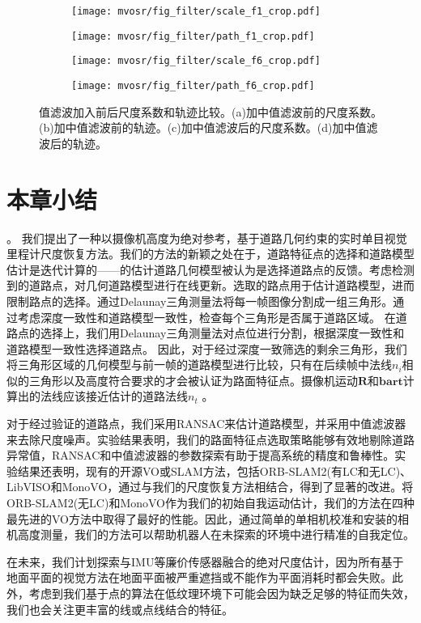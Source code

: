 \begin{figure}\centering
    \begin{subfigure}[h]{0.4\textwidth}
    \texttt{[image: mvosr/fig\_filter/scale\_f1\_crop.pdf]}
    \caption{}
    \end{subfigure}
    \vspace{2mm}
    \begin{subfigure}[h]{0.4\textwidth}
    \texttt{[image: mvosr/fig\_filter/path\_f1\_crop.pdf]}
    \caption{}
    \end{subfigure}
    \begin{subfigure}[h]{0.39\textwidth}
    \texttt{[image: mvosr/fig\_filter/scale\_f6\_crop.pdf]}
    \caption{}
    \end{subfigure}
    \begin{subfigure}[h]{0.4\textwidth}
    \texttt{[image: mvosr/fig\_filter/path\_f6\_crop.pdf]}
    \caption{}
    \end{subfigure}
    \caption{值滤波加入前后尺度系数和轨迹比较。(a)加中值滤波前的尺度系数。(b)加中值滤波前的轨迹。(c)加中值滤波后的尺度系数。(d)加中值滤波后的轨迹。}
    \label{fig:filter_path}
\end{figure}

\section{本章小结}
\label{sec:Conclusion}。
我们提出了一种以摄像机高度为绝对参考，基于道路几何约束的实时单目视觉里程计尺度恢复方法。我们的方法的新颖之处在于，道路特征点的选择和道路模型估计是迭代计算的——的估计道路几何模型被认为是选择道路点的反馈。考虑检测到的道路点，对几何道路模型进行在线更新。选取的路点用于估计道路模型，进而限制路点的选择。通过Delaunay三角测量法\cite{shewchuk1996triangle}将每一帧图像分割成一组三角形。通过考虑深度一致性和道路模型一致性，检查每个三角形是否属于道路区域。
在道路点的选择上，我们用Delaunay三角测量法对点位进行分割，根据深度一致性和道路模型一致性选择道路点。
因此，对于经过深度一致筛选的剩余三角形，我们将三角形区域的几何模型与前一帧的道路模型进行比较，只有在后续帧中法线$n_i$相似的三角形以及高度符合要求的才会被认证为路面特征点。摄像机运动$\mathbf{R}$和$\mathbf{bar{t}}$计算出的法线应该接近估计的道路法线$n_t$ 。

对于经过验证的道路点，我们采用RANSAC来估计道路模型，并采用中值滤波器来去除尺度噪声。实验结果表明，我们的路面特征点选取策略能够有效地剔除道路异常值，RANSAC和中值滤波器的参数探索有助于提高系统的精度和鲁棒性。实验结果还表明，现有的开源VO或SLAM方法，包括ORB-SLAM2(有LC和无LC)、LibVISO和MonoVO，通过与我们的尺度恢复方法相结合，得到了显著的改进。将ORB-SLAM2(无LC)和MonoVO作为我们的初始自我运动估计，我们的方法在四种最先进的VO方法中取得了最好的性能。因此，通过简单的单相机校准和安装的相机高度测量，我们的方法可以帮助机器人在未探索的环境中进行精准的自我定位。

在未来，我们计划探索与IMU等廉价传感器融合的绝对尺度估计，因为所有基于地面平面的视觉方法在地面平面被严重遮挡或不能作为平面消耗时都会失败。此外，考虑到我们基于点的算法在低纹理环境下可能会因为缺乏足够的特征而失效，我们也会关注更丰富的线或点线结合的特征。
